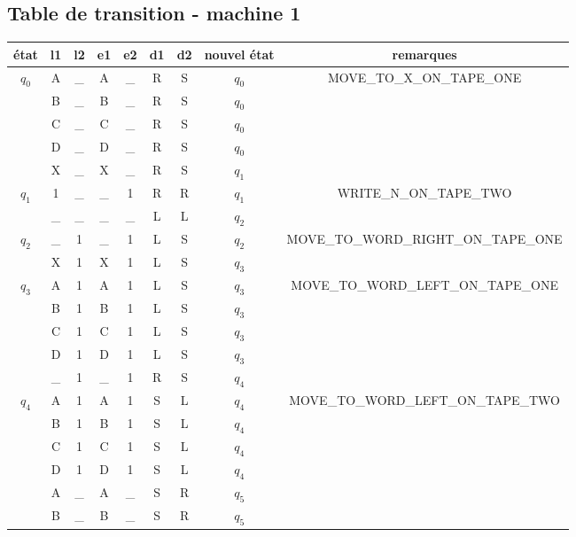 \documentclass{report}
\begin{document}
\begin{appendix}
  \chapter{Table de transition - machine 1}
    \begin{table}
      \begin{tabular}{| c | c c | c c | c c | c | c |}
        \hline
        état & l1 & l2 & e1 & e2 & d1 & d2 & nouvel état & remarques \\
        \hline
        $q_0$ & A & \_ & A & \_ & R & S & $q_0$ & MOVE\_TO\_X\_ON\_TAPE\_ONE \\
             & B & \_ & B & \_ & R & S & $q_0$ & \\
             & C & \_ & C & \_ & R & S & $q_0$ & \\
             & D & \_ & D & \_ & R & S & $q_0$ & \\
             & X & \_ & X & \_ & R & S & $q_1$ & \\
        \hline 
        $q_1$ & 1 & \_ & \_ & 1 & R & R & $q_1$ & WRITE\_N\_ON\_TAPE\_TWO \\
             & \_ & \_ & \_ & \_ & L & L & $q_2$ & \\
        \hline
        $q_2$ & \_ & 1 & \_ & 1 & L & S & $q_2$ & MOVE\_TO\_WORD\_RIGHT\_ON\_TAPE\_ONE \\
             & X & 1 & X & 1 & L & S & $q_3$ & \\
        \hline
        $q_3$ & A & 1 & A & 1 & L & S & $q_3$ & MOVE\_TO\_WORD\_LEFT\_ON\_TAPE\_ONE \\
             & B & 1 & B & 1 & L & S & $q_3$ & \\
             & C & 1 & C & 1 & L & S & $q_3$ & \\
             & D & 1 & D & 1 & L & S & $q_3$ & \\
             & \_ & 1 & \_ & 1 & R & S & $q_4$ & \\
        \hline
        $q_4$ & A & 1 & A & 1 & S & L & $q_4$ & MOVE\_TO\_WORD\_LEFT\_ON\_TAPE\_TWO \\
             & B & 1 & B & 1 & S & L & $q_4$ & \\
             & C & 1 & C & 1 & S & L & $q_4$ & \\
             & D & 1 & D & 1 & S & L & $q_4$ & \\
             & A & \_ & A & \_ & S & R & $q_5$ & \\
             & B & \_ & B & \_ & S & R & $q_5$ & \\

\end{tabular}
\end{table}
\end{appendix}
\end{document}
